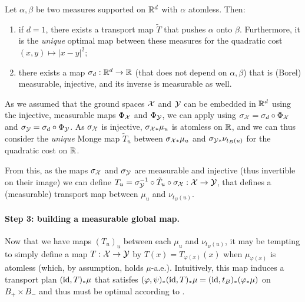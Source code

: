 \begin{proposition}\label{prop:fact_nonsense}
    Let $\alpha,\beta$ be two measures supported on $\mathbb{R}^d$ with $\alpha$ atomless. Then:
    \begin{enumerate}[label=(\roman*),nolistsep]
        \item if $d=1$, there exists a transport map $\tilde{T}$ that pushes $\alpha$ onto $\beta$. Furthermore, it is the \emph{unique} optimal map between these measures for the quadratic cost $(x,y) \mapsto |x - y|^2$;
        \item \label{item:sigma_d} there exists a map $\sigma_d : \mathbb{R}^d \to \mathbb{R}$ (that does not depend on $\alpha,\beta$) that is (Borel) measurable, injective, and its inverse is measurable as well.
    \end{enumerate}
\end{proposition}

As we assumed that the ground spaces $\mathcal{X}$ and $\mathcal{Y}$ can be embedded in $\mathbb{R}^d$ using the injective, measurable maps $\Phi_{\mathcal{X}}$ and $\Phi_{\mathcal{Y}}$, we can apply  using $\sigma_{\mathcal{X}} = \sigma_d \circ \Phi_{\mathcal{X}}$ and $\sigma_{\mathcal{Y}} = \sigma_d \circ \Phi_{\mathcal{Y}}$.
As $\sigma_{\mathcal{X}}$ is injective, $\sigma_{\mathcal{X}*} \mu_u$ is atomless on $\mathbb{R}$, and we can thus consider the \emph{unique} Monge map $\tilde{T}_u$ between $\sigma_{\mathcal{X}*}\mu_u$ and $\sigma_{\mathcal{Y}*} \nu_{t_B(u)}$ for the quadratic cost on $\mathbb{R}$.

From this, as the maps $\sigma_{\mathcal{X}}$ and $\sigma_{\mathcal{Y}}$ are measurable and injective (thus invertible on their image) we can define $T_u = \sigma_{\mathcal{Y}}^{-1} \circ \tilde{T}_u \circ \sigma_{\mathcal{X}} : \mathcal{X} \to \mathcal{Y}$, that defines a (measurable) transport map between $\mu_u$ and $\nu_{t_B(u)}$.

\paragraph{Step 3: building a measurable global map.} Now that we have maps $(T_u)_u$ between each $\mu_u$ and $\nu_{t_B(u)}$, it may be tempting to simply define a map $T : \mathcal{X} \to \mathcal{Y}$ by $T(x) = T_{\varphi(x)}(x)$ when $\mu_{\varphi(x)}$ is atomless (which, by assumption, holds $\mu$-a.e.).
Intuitively, this map induces a transport plan $(\operatorname{id}, T)_*\mu$ that satisfes $(\varphi,\psi)_*(\operatorname{id},T)_*\mu = (\operatorname{id}, t_B)_*(\varphi _* \mu)$ on $B_+ \times B_-$ and thus must be optimal according to .

